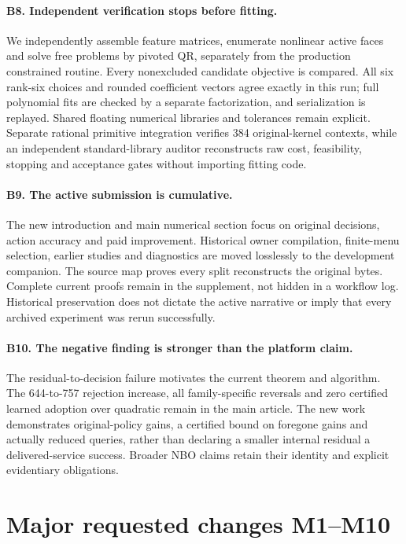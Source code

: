 \documentclass[11pt]{article}
\begin{document}
\paragraph{B8. Independent verification stops before fitting.}
We independently assemble feature matrices, enumerate nonlinear active faces and solve free problems by pivoted QR, separately from the production constrained routine. Every nonexcluded candidate objective is compared. All six rank-six choices and rounded coefficient vectors agree exactly in this run; full polynomial fits are checked by a separate factorization, and serialization is replayed. Shared floating numerical libraries and tolerances remain explicit. Separate rational primitive integration verifies 384 original-kernel contexts, while an independent standard-library auditor reconstructs raw cost, feasibility, stopping and acceptance gates without importing fitting code.

\paragraph{B9. The active submission is cumulative.}
The new introduction and main numerical section focus on original decisions, action accuracy and paid improvement. Historical owner compilation, finite-menu selection, earlier studies and diagnostics are moved losslessly to the development companion. The source map proves every split reconstructs the original bytes. Complete current proofs remain in the supplement, not hidden in a workflow log. Historical preservation does not dictate the active narrative or imply that every archived experiment was rerun successfully.

\paragraph{B10. The negative finding is stronger than the platform claim.}
The residual-to-decision failure motivates the current theorem and algorithm. The 644-to-757 rejection increase, all family-specific reversals and zero certified learned adoption over quadratic remain in the main article. The new work demonstrates original-policy gains, a certified bound on foregone gains and actually reduced queries, rather than declaring a smaller internal residual a delivered-service success. Broader NBO claims retain their identity and explicit evidentiary obligations.

\section*{Major requested changes M1--M10}
\end{document}
